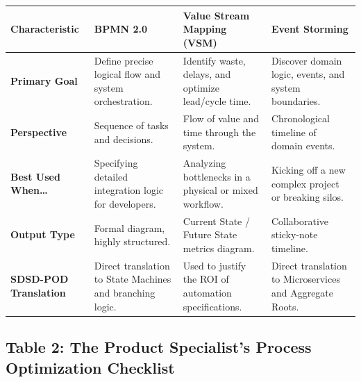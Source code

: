 \begin{longtable}[]{@{}
  >{\raggedright\arraybackslash}p{}
  >{\raggedright\arraybackslash}p{}
  >{\raggedright\arraybackslash}p{}
  >{\raggedright\arraybackslash}p{}@{}}
\toprule\noalign{}
\begin{minipage}[b]{\linewidth}\raggedright
Characteristic
\end{minipage} & \begin{minipage}[b]{\linewidth}\raggedright
BPMN 2.0
\end{minipage} & \begin{minipage}[b]{\linewidth}\raggedright
Value Stream Mapping (VSM)
\end{minipage} & \begin{minipage}[b]{\linewidth}\raggedright
Event Storming
\end{minipage} \\
\midrule\noalign{}
\endhead
\bottomrule\noalign{}
\endlastfoot
\textbf{Primary Goal} & Define precise logical flow and system
orchestration. & Identify waste, delays, and optimize lead/cycle time. &
Discover domain logic, events, and system boundaries. \\
\textbf{Perspective} & Sequence of tasks and decisions. & Flow of value
and time through the system. & Chronological timeline of domain
events. \\
\textbf{Best Used When\ldots{}} & Specifying detailed integration logic
for developers. & Analyzing bottlenecks in a physical or mixed workflow.
& Kicking off a new complex project or breaking silos. \\
\textbf{Output Type} & Formal diagram, highly structured. & Current
State / Future State metrics diagram. & Collaborative sticky-note
timeline. \\
\textbf{SDSD-POD Translation} & Direct translation to State Machines and
branching logic. & Used to justify the ROI of automation specifications.
& Direct translation to Microservices and Aggregate Roots. \\
\end{longtable}

\subsection{Table 2: The Product Specialist's Process Optimization
Checklist}\label{table-2-the-product-specialists-process-optimization-checklist}

